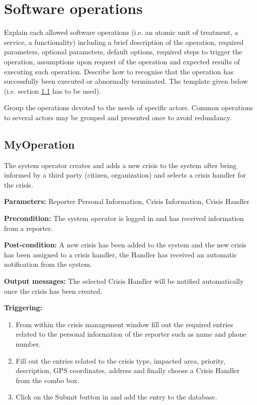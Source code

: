 \chapter{Software operations}
\label{chap:soptware_operations}


Explain each allowed software operations (i.e. an atomic unit of treatment, a service, a functionality) including a brief description of the operation, required parameters, optional parameters, default options, required steps to trigger the operation, assumptions upon request of the operation and expected results of executing such operation.
Describe how to recognise that the operation has successfully been executed or
abnormally terminated. The template given below (i.e. section \ref{operation:MyOperation} has to be used).

Group the operations devoted to the needs of specific actors. Common
operations to several actors may be grouped and presented once to avoid redundancy.


\section{MyOperation}
\label{operation:MyOperation}
The system operator creates and adds a new crisis to the system after being 
informed by a third party (citizen, organization) and selects a crisis handler for the crisis.

\begin{description}

\item \textbf{Parameters:} Reporter Personal Information, Crisis Information, Crisis Handler
\item \textbf{Precondition:} The system operator is logged in and has received information from a reporter.
\item \textbf{Post-condition:} A new crisis has been added to the system and the new crisis has been assigned to a crisis handler, the Handler has received an automatic notification from the system.
\item \textbf{Output messages:} The selected Crisis Handler will be notified
automatically once the crisis has been created.

\item \textbf{Triggering:}
\begin{enumerate}
\item From within the crisis management window fill out the required entries related to the personal information of the reporter such as name and phone number.
\item Fill out the entries related to the crisis type, impacted area, priority, description, GPS coordinates, address and finally choose a Crisis Handler from the combo box.
\item Click on the Submit button in and add the entry to the database.
\end{enumerate}

 
\end{description}

